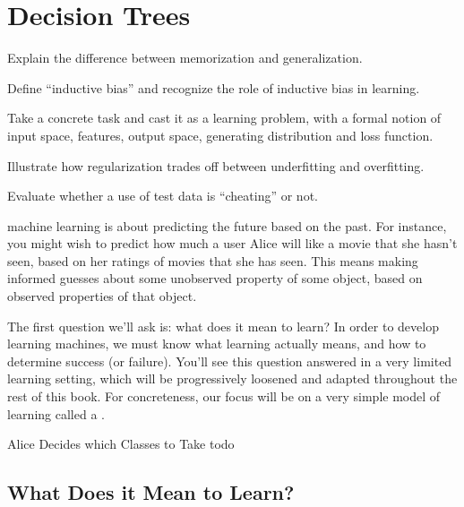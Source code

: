 
\chapter{Decision Trees} \label{sec:dt}




\begin{learningobjectives}
\item Explain the difference between memorization and generalization.
\item Define ``inductive bias'' and recognize the role of inductive
  bias in learning.
\item Take a concrete task and cast it as a learning problem, with a
  formal notion of input space, features, output space, generating
  distribution and loss function.
\item Illustrate how regularization trades off between underfitting
  and overfitting.
\item Evaluate whether a use of test data is ``cheating'' or not.
\end{learningobjectives}


 machine learning is about predicting
the future based on the past.  For instance, you might wish to predict
how much a user Alice will like a movie that she hasn't seen, based on
her ratings of movies that she has seen.  This means making informed
guesses about some unobserved property of some object, based on
observed properties of that object.

The first question we'll ask is: what does it mean to learn?  In order
to develop learning machines, we must know what learning actually
means, and how to determine success (or failure).  You'll see this
question answered in a very limited learning setting, which will be
progressively loosened and adapted throughout the rest of this book.
For concreteness, our focus will be on a very simple model of learning
called a .

\begin{vignette}{Alice Decides which Classes to Take}
todo
\end{vignette}


\section{What Does it Mean to Learn?}

